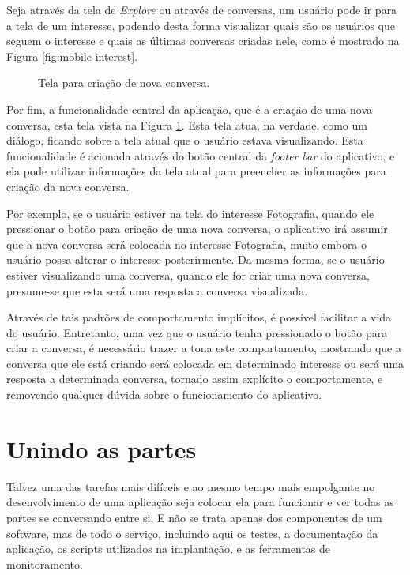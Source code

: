 \documentclass[diss]{template/setrem}
\begin{document}
Seja através da tela de \emph{Explore} ou através de conversas, um usuário pode ir para a tela de um interesse, podendo desta forma visualizar quais são os usuários que seguem o interesse e quais as últimas conversas criadas nele, como é mostrado na Figura \ref{fig:mobile-interest}.

\begin{figure}[!h]
    \caption{Tela para criação de nova conversa.}
    \label{fig:mobile-new-conversation}
\end{figure}

Por fim, a funcionalidade central da aplicação, que é a criação de uma nova conversa, esta tela vista na Figura \ref{fig:mobile-new-conversation}. Esta tela atua, na verdade, como um diálogo, ficando sobre a tela atual que o usuário estava visualizando. Esta funcionalidade é acionada através do botão central da \emph{footer bar} do aplicativo, e ela pode utilizar informações da tela atual para preencher as informações para criação da nova conversa.

Por exemplo, se o usuário estiver na tela do interesse Fotografia, quando ele pressionar o botão para criação de uma nova conversa, o aplicativo irá assumir que a nova conversa será colocada no interesse Fotografia, muito embora o usuário possa alterar o interesse posterirmente. Da mesma forma, se o usuário estiver visualizando uma conversa, quando ele for criar uma nova conversa, presume-se que esta será uma resposta a conversa visualizada.

Através de tais padrões de comportamento implícitos, é possível facilitar a vida do usuário. Entretanto, uma vez que o usuário tenha pressionado o botão para criar a conversa, é necessário trazer a tona este comportamento, mostrando que a conversa que ele está criando será colocada em determinado interesse ou será uma resposta a determinada conversa, tornado assim explícito o comportamente, e removendo qualquer dúvida sobre o funcionamento do aplicativo.


\section{Unindo as partes}
Talvez uma das tarefas mais difíceis e ao mesmo tempo mais empolgante no desenvolvimento de uma aplicação seja colocar ela para funcionar e ver todas as partes se conversando entre si. E não se trata apenas dos componentes de um software, mas de todo o serviço, incluindo aqui os testes, a documentação da aplicação, os scripts utilizados na implantação, e as ferramentas de monitoramento.
\end{document}
